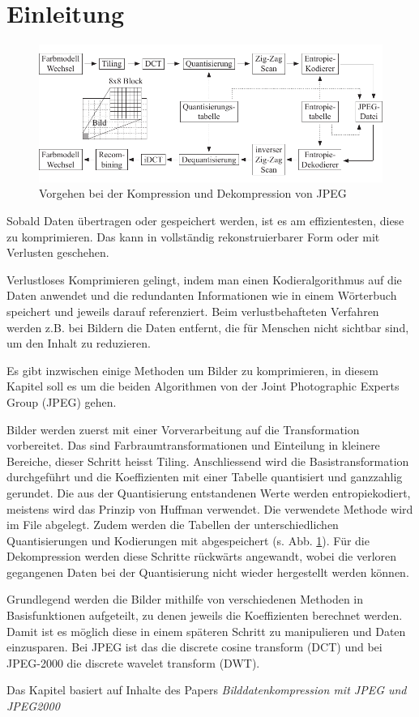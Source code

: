 %
%
%
%
\section{Einleitung\label{jpeg:section:einleitung}}
\begin{figure}
    \centering
    \includegraphics[width=\linewidth]{papers/jpeg/pictures/kompressionsschema.pdf}
    \caption{Vorgehen bei der Kompression und Dekompression von JPEG
        \label{jpeg:fig:kompressionsschema}}
\end{figure}
Sobald Daten übertragen oder gespeichert werden, ist es am effizientesten, diese zu komprimieren.
Das kann in vollständig rekonstruierbarer Form oder mit Verlusten geschehen.

Verlustloses Komprimieren gelingt, indem man einen Kodieralgorithmus auf die Daten anwendet und die redundanten Informationen wie in einem Wörterbuch speichert und jeweils darauf referenziert. Beim verlustbehafteten Verfahren werden z.B. bei Bildern die Daten entfernt, die für Menschen nicht sichtbar sind, um den Inhalt zu reduzieren.

Es gibt inzwischen einige Methoden um Bilder zu komprimieren, in diesem Kapitel soll es um die beiden Algorithmen von der Joint Photographic Experts Group (JPEG) gehen.


Bilder werden zuerst mit einer Vorverarbeitung auf die Transformation vorbereitet.
Das sind Farb\-raumtransformationen und Einteilung in kleinere Bereiche, dieser Schritt heisst Tiling.
Anschliessend wird die Basistransformation durchgeführt und die Koeffizienten mit einer Tabelle quantisiert und ganzzahlig gerundet.
Die aus der Quantisierung entstandenen Werte werden entropiekodiert, meistens wird das Prinzip von Huffman verwendet.
Die verwendete Methode wird im File abgelegt.
Zudem werden die Tabellen der unterschiedlichen Quantisierungen und Kodierungen mit abgespeichert (s. Abb. \ref{jpeg:fig:kompressionsschema}).
Für die Dekompression werden diese Schritte rückwärts angewandt, wobei die verloren gegangenen Daten bei der Quantisierung nicht wieder hergestellt werden können. 

Grundlegend werden die Bilder mithilfe von verschiedenen Methoden in Basisfunktionen aufgeteilt, zu denen jeweils die Koeffizienten berechnet werden.
Damit ist es möglich diese in einem späteren Schritt zu manipulieren und Daten einzusparen. 
Bei JPEG ist das die discrete cosine transform (DCT) und bei JPEG-2000 die discrete wavelet transform (DWT).

Das Kapitel basiert auf Inhalte des Papers \textit{Bilddatenkompression mit JPEG und JPEG2000}\cite{jpeg:laurahochstrat}
